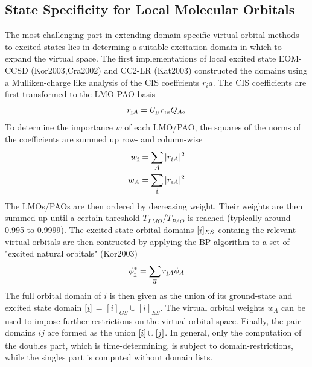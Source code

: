 \subsection{State Specificity for Local Molecular Orbitals}

The most challenging part in extending domain-specific virtual orbital methods to excited states lies in determing a suitable excitation domain in which to expand the virtual space. The first implementations of local excited state EOM-CCSD (Kor2003,Cra2002) and CC2-LR (Kat2003) constructed the domains using a Mulliken-charge like analysis of the CIS coeffcients $r_ia$. The CIS coefficients are first transformed to the LMO-PAO basis
\begin{equation}
r_{\underline{i} A} = U_{\underline{i} i } r_{ia} Q_{Aa} 
\end{equation}
\noindent To determine the importance $w$ of each LMO/PAO, the squares of the norms of the coefficients are summed up row- and column-wise
\begin{equation}
\begin{split}
w_{\underline{i}} &= \sum_A |r_{\underline{i} A}|^2 \\
w_{A} &= \sum_{\underline{i}} |r_{\underline{i} A}|^2
\end{split}
\end{equation}
\noindent The LMOs/PAOs are then ordered by decreasing weight. Their weights are then summed up until a certain threshold $T_{LMO}$/$T_{PAO}$ is reached (typically around 0.995 to 0.9999). The excited state orbital domains $[\underline{i}]_{ES}$ containg the relevant virtual orbitals are then contructed by applying the BP algorithm to a set of "excited natural orbitals" (Kor2003)
\begin{equation}
\phi_{\underline{i}}^* = \sum_{\overline{a}} r_{\underline{i} A} \phi_A  
\end{equation} 
\noindent The full orbital domain of $i$ is then given as the union of its ground-state and excited state domain $[\underline{i}]$ = $[i]_{GS} \cup [i]_{ES}$. The virtual orbital weights $w_A$ can be used to impose further restrictions on the virtual orbital space. Finally, the pair domains $ij$ are formed as the union $[\underline{i}] \cup [\underline{j}]$. In general, only the computation of the doubles part, which is time-determining, is subject to domain-restrictions, while the singles part is computed without domain lists.

